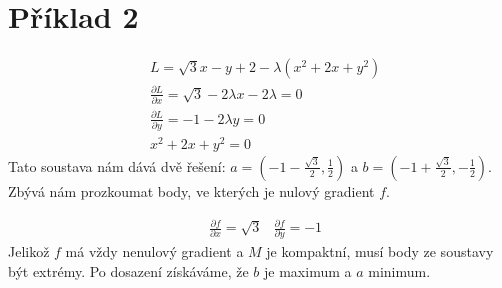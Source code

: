 \documentclass[11pt,a4paper]{article}
\begin{document}
\section*{Příklad 2}
\begin{align*}
	& L = \sqrt{3}x-y+2 -\lambda(x^2 + 2x + y^2) \\
	& \frac{\partial L}{\partial x} = \sqrt{3} - 2\lambda x -2\lambda = 0 \\
	& \frac{\partial L}{\partial y} = -1 - 2\lambda y  = 0\\
	& x^2 + 2x + y^2 = 0	
\end{align*}
Tato soustava nám dává dvě řešení: $a = (-1-\frac{\sqrt{3}}{2}, \frac{1}{2})$ a $b = (-1+\frac{\sqrt{3}}{2}, -\frac{1}{2})$. Zbývá nám prozkoumat body, ve kterých je nulový gradient $f$.

\begin{align*}
	& \frac{\partial f}{\partial x} = \sqrt{3}
	& \frac{\partial f}{\partial y} = -1
\end{align*}
Jelikož $f$ má vždy nenulový gradient a $M$ je kompaktní, musí body ze soustavy být extrémy. Po dosazení získáváme, že $b$ je maximum a $a$ minimum. 
\end{document}
